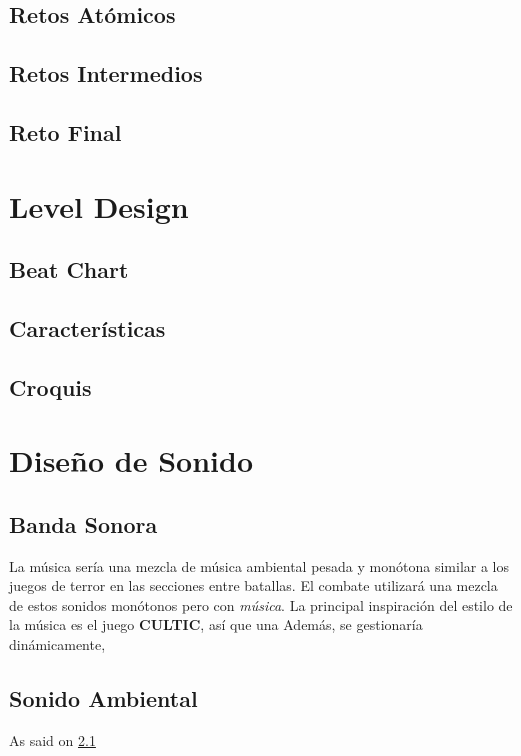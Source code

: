     \subsection{Retos Atómicos}
    \subsection{Retos Intermedios}
    \subsection{Reto Final}

\section{Level Design} \label{levelDesign}
    \subsection{Beat Chart}
    \subsection{Características}

    \subsection{Croquis}

\section{Diseño de Sonido}
    \subsection{Banda Sonora} \label{ost}
        La música sería una mezcla de música ambiental pesada y monótona similar a los juegos de terror en las secciones entre batallas. El combate utilizará una mezcla de estos sonidos monótonos pero con \textit{música}.
        La principal inspiración del estilo de la música es el juego \textbf{CULTIC}, así que una
        Además, se gestionaría dinámicamente,

    \subsection{Sonido Ambiental}
        As said on \ref{ost}
